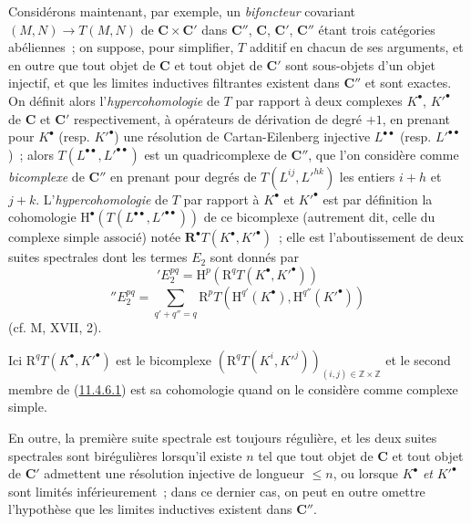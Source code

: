 \begin{env}[11.4.6]
\label{0.11.4.6-fr}
Considérons maintenant, par exemple, un \emph{bifoncteur} covariant
$(M,N)\to T(M,N)$ de $\boldsymbol{C}\times\boldsymbol{C}'$ dans $\boldsymbol{C}''$,
$\boldsymbol{C}$, $\boldsymbol{C}'$, $\boldsymbol{C}''$ étant trois catégories
abéliennes~; on suppose, pour simplifier, $T$ additif en chacun de ses
arguments, et en outre que tout objet de $\boldsymbol{C}$ et tout objet de
$\boldsymbol{C}'$ sont sous-objets d'un objet injectif, et que les limites
inductives filtrantes existent dans $\boldsymbol{C}''$ et sont exactes. On définit
alors l'\emph{hypercohomologie} de $T$ par rapport à deux complexes
$K^\bullet$, $K'^\bullet$ de $\boldsymbol{C}$ et $\boldsymbol{C}'$ respectivement, à
opérateurs de dérivation de degré $+1$, en prenant pour $K^\bullet$ (resp.
$K'^\bullet$) une résolution de Cartan-Eilenberg injective
$L^{\bullet\bullet}$ (resp. $L'^{\bullet\bullet}$)~; alors
$T(L^{\bullet\bullet},L'^{\bullet\bullet})$ est un quadricomplexe de
$\boldsymbol{C}''$, que l'on considère comme \emph{bicomplexe} de $\boldsymbol{C}''$
en prenant pour degrés de $T(L^{ij},L'^{hk})$ les entiers $i+h$ et $j+k$.
L'\emph{hypercohomologie} de $T$ par rapport à $K^\bullet$ et $K'^\bullet$
est par définition la cohomologie
$\mathrm H^\bullet(T(L^{\bullet\bullet},L'^{\bullet\bullet}))$ de ce
bicomplexe (autrement dit, celle du complexe simple associé)
notée
$\mathbf R^\bullet T(K^\bullet,K'^\bullet)$~; elle est l'aboutissement de
deux suites spectrales dont les termes $E_2$ sont donnés par
\[
  \label{0.11.4.6.1-fr}
  'E_2^{pq}=\mathrm H^p(\mathrm R^qT(K^\bullet,K'^\bullet))
  \tag{11.4.6.1}
\]
\[
  \label{0.11.4.6.2-fr}
  ''E_2^{pq}=\sum_{q'+q''=q}
  \mathrm R^pT(\mathrm H^{q'}(K^\bullet),\mathrm H^{q''}(K'^\bullet))
  \tag{11.4.6.2}
\]
(cf. M, XVII, 2).

Ici $\mathrm R^qT(K^\bullet,K'^\bullet)$ est le bicomplexe
$(\mathrm R^qT(K^i,K'^j))_{(i,j)\in\mathbb Z\times\mathbb Z}$ et le second
membre de (\hyperref[0.11.4.6.1-fr]{11.4.6.1}) est sa cohomologie quand on le
considère comme complexe simple.

En outre, la première suite spectrale est toujours régulière, et les deux
suites spectrales sont birégulières lorsqu'il existe $n$ tel que tout objet de
$\boldsymbol{C}$ et tout objet de $\boldsymbol{C}'$ admettent une résolution injective
de longueur $\leq n$, ou lorsque $K^\bullet$ \emph{et} $K'^\bullet$ sont limités
inférieurement~; dans ce dernier cas, on peut en outre omettre l'hypothèse que
les limites inductives existent dans $\boldsymbol{C}''$.


\end{env}
